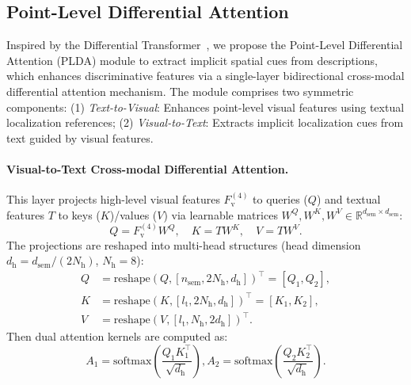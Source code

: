 \documentclass[letterpaper]{article} %
\begin{document}
\subsection{Point-Level Differential Attention}
\label{sec:PLDA}


Inspired by the Differential Transformer~\cite{yeDifferentialTransformer2024}, we propose the Point-Level Differential Attention (PLDA) module to extract implicit spatial cues from descriptions, which enhances discriminative features via a single-layer bidirectional cross-modal differential attention mechanism. The module comprises two symmetric components: 
(1) \textit{Text-to-Visual}: Enhances point-level visual features using textual localization references;  
(2) \textit{Visual-to-Text}: Extracts implicit localization cues from text guided by visual features.
\paragraph{Visual-to-Text Cross-modal Differential Attention.} This layer projects high-level visual features $F_{\mathrm{v}}^{(4)}$ to queries ($Q$) and textual features $T$ to keys ($K$)/values ($V$) via learnable matrices $W^Q, W^K, W^V \in \mathbb{R}^{d_\mathrm{sem} \times d_\mathrm{sem}}$:
\begin{equation}
	Q = F_{\mathrm{v}}^{(4)} W^Q, \quad 
	K = T W^K, \quad 
	V = T W^V.
	\label{eq:projection}
\end{equation}
The projections are reshaped into multi-head structures (head dimension $d_\mathrm{h} = d_\mathrm{sem}/(2N_\mathrm{h})$, $N_\mathrm{h}=8$):
\begin{equation}
	\begin{aligned}
		Q &= \text{reshape}\left(Q, [n_\mathrm{sem}, 2N_\mathrm{h}, d_\mathrm{h}]\right)^\intercal = [Q_1, Q_2], \\
		K &= \text{reshape}\left(K, [l_\mathrm{t}, 2N_\mathrm{h}, d_\mathrm{h}]\right)^\intercal = [K_1, K_2], \\
		V &= \text{reshape}\left(V, [l_\mathrm{t}, N_\mathrm{h}, 2d_\mathrm{h}]\right)^\intercal.
	\end{aligned}
	\label{eq:q_k_v}
\end{equation}
Then dual attention kernels are computed as:
\begin{equation}
	A_1 = \text{softmax}\left(\frac{Q_1 K_1^\intercal}{\sqrt{d_\mathrm{h}}}\right), 
	A_2 = \text{softmax}\left(\frac{Q_2 K_2^\intercal}{\sqrt{d_\mathrm{h}}}\right).
	\label{eq:a_1_a_2}
\end{equation}
\end{document}
